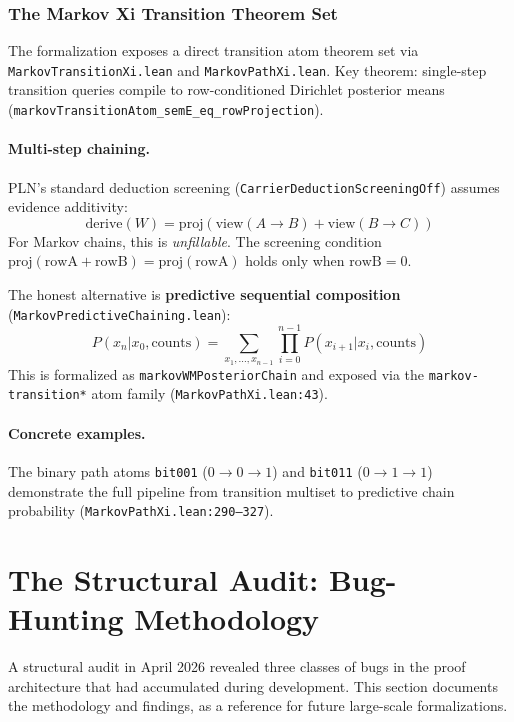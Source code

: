 \documentclass[11pt,a4paper]{article}
\theoremstyle{definition}
\begin{document}
\subsubsection{The Markov Xi Transition Theorem Set}

The formalization exposes a direct transition atom theorem set via
\texttt{MarkovTransitionXi.lean} and \texttt{MarkovPathXi.lean}.
Key theorem: single-step transition queries compile to row-conditioned
Dirichlet posterior means (\texttt{markovTransitionAtom\_semE\_eq\_rowProjection}).

\paragraph{Multi-step chaining.} PLN's standard deduction screening
(\texttt{CarrierDeductionScreeningOff}) assumes evidence additivity:
\[
  \mathrm{derive}(W) = \mathrm{proj}(\mathrm{view}(A{\to}B) + \mathrm{view}(B{\to}C))
\]
For Markov chains, this is \emph{unfillable}. The screening condition
$\mathrm{proj}(\mathrm{rowA} + \mathrm{rowB}) = \mathrm{proj}(\mathrm{rowA})$
holds only when $\mathrm{rowB} = 0$.

The honest alternative is \textbf{predictive sequential composition}
(\texttt{MarkovPredictiveChaining.lean}):
\[
  P(x_n | x_0, \mathrm{counts}) = \sum_{x_1,\ldots,x_{n-1}} \prod_{i=0}^{n-1} P(x_{i+1} | x_i, \mathrm{counts})
\]
This is formalized as \texttt{markovWMPosteriorChain} and exposed via
the \texttt{markov-transition*} atom family (\texttt{MarkovPathXi.lean:43}).

\paragraph{Concrete examples.} The binary path atoms \texttt{bit001} ($0 \to 0 \to 1$)
and \texttt{bit011} ($0 \to 1 \to 1$) demonstrate the full pipeline from
transition multiset to predictive chain probability (\texttt{MarkovPathXi.lean:290--327}).

\section{The Structural Audit: Bug-Hunting Methodology}
\label{sec:audit}

A structural audit in April 2026 revealed three classes of bugs in the
proof architecture that had accumulated during development. This section
documents the methodology and findings, as a reference for future
large-scale formalizations.
\end{document}
